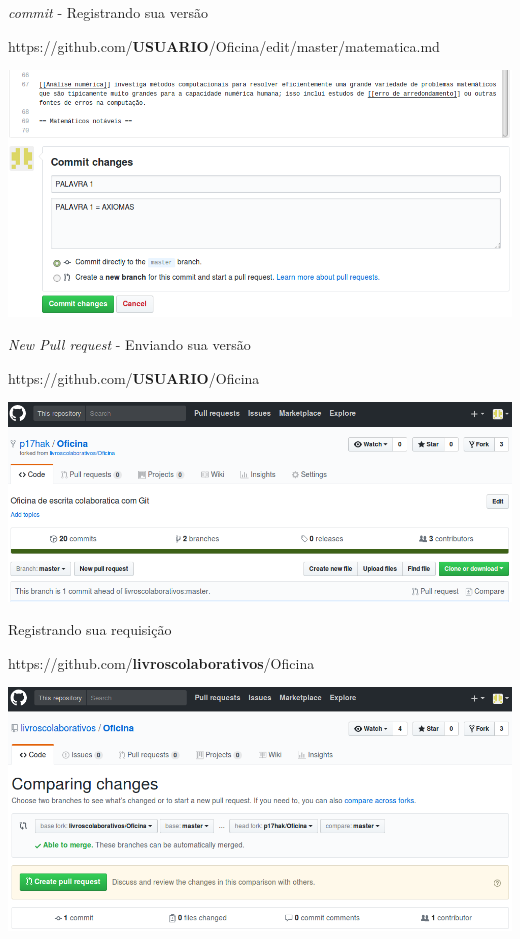 \documentclass{beamer}
\begin{document}
\begin{frame}{{\it commit} - Registrando sua versão}
  \begin{center}
    https://github.com/{\bf USUARIO}/Oficina/edit/master/matematica.md

    \includegraphics[scale=0.3]{./figs/commit_GitHub.png}
  \end{center}
\end{frame}

\begin{frame}{{\it New Pull request} - Enviando sua versão}
  \begin{center}
    https://github.com/{\bf USUARIO}/Oficina

    \includegraphics[scale=0.3]{./figs/New_pull_request_GitHub.png}
  \end{center}
\end{frame}

\begin{frame}{Registrando sua requisição}
  \begin{center}
    https://github.com/{\bf livroscolaborativos}/Oficina

    \includegraphics[scale=0.3]{./figs/Create_pull_request_GitHub.png}
  \end{center}
\end{frame}
\end{document}
